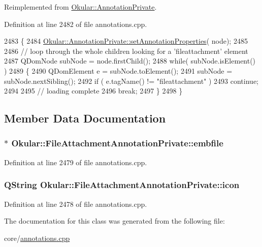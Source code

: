 Reimplemented from \hyperlink{classOkular_1_1AnnotationPrivate_a5fc7b450fa8c7e2717372e7394c3aa39}{Okular\+::\+Annotation\+Private}.



Definition at line 2482 of file annotations.\+cpp.


\begin{DoxyCode}
2483 \{
2484     \hyperlink{classOkular_1_1AnnotationPrivate_a5fc7b450fa8c7e2717372e7394c3aa39}{Okular::AnnotationPrivate::setAnnotationProperties}(
      node);
2485 
2486     \textcolor{comment}{// loop through the whole children looking for a 'fileattachment' element}
2487     QDomNode subNode = node.firstChild();
2488     \textcolor{keywordflow}{while}( subNode.isElement() )
2489     \{
2490         QDomElement e = subNode.toElement();
2491         subNode = subNode.nextSibling();
2492         \textcolor{keywordflow}{if} ( e.tagName() != \textcolor{stringliteral}{"fileattachment"} )
2493             \textcolor{keywordflow}{continue};
2494 
2495         \textcolor{comment}{// loading complete}
2496         \textcolor{keywordflow}{break};
2497     \}
2498 \}
\end{DoxyCode}


\subsection{Member Data Documentation}
\hypertarget{classOkular_1_1FileAttachmentAnnotationPrivate_a374db87a34e6d35a53ec4d00d0b00caa}{
\subsubsection[{embfile}]{$\ast$ Okular\+::\+File\+Attachment\+Annotation\+Private\+::embfile}}\label{classOkular_1_1FileAttachmentAnnotationPrivate_a374db87a34e6d35a53ec4d00d0b00caa}


Definition at line 2479 of file annotations.\+cpp.

\hypertarget{classOkular_1_1FileAttachmentAnnotationPrivate_a9ca542a052b18ab5cb7b37d7e5ddede4}{
\subsubsection[{icon}]{\setlength{\rightskip}{0pt plus 5cm}Q\+String Okular\+::\+File\+Attachment\+Annotation\+Private\+::icon}}\label{classOkular_1_1FileAttachmentAnnotationPrivate_a9ca542a052b18ab5cb7b37d7e5ddede4}


Definition at line 2478 of file annotations.\+cpp.



The documentation for this class was generated from the following file\+:\begin{DoxyCompactItemize}
\item 
core/\hyperlink{annotations_8cpp}{annotations.\+cpp}\end{DoxyCompactItemize}
